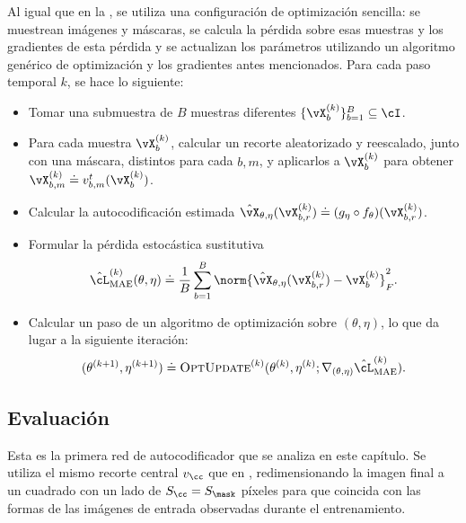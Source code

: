 \documentclass[../../book-main_es.tex]{subfiles}
\begin{document}
Al igual que en la , se utiliza una configuración de optimización sencilla:
se muestrean imágenes y máscaras, se calcula la pérdida sobre
esas muestras y los gradientes de esta pérdida y se actualizan los
parámetros utilizando un algoritmo genérico de optimización y los
gradientes antes mencionados. Para cada paso temporal \(k\), se hace lo siguiente:
\begin{itemize}
\item Tomar una submuestra de \(B\) muestras diferentes \(\{\vX_{b}^{(k)}\}_{b =
    1}^{B} \subseteq \cI\).
\item Para cada muestra \(\vX_{b}^{(k)}\), calcular un recorte aleatorizado y reescalado, 
    junto con una máscara, distintos para cada \(b, m\), y aplicarlos a \(\vX_{b}^{(k)}\) 
    para obtener \(\vX_{b,m}^{(k)} \doteq v_{b,m}^{t}(\vX_{b}^{(k)})\).
\item Calcular la autocodificación estimada \(\hat{\vX}_{\theta,
        \eta}(\vX_{b, r}^{(k)}) \doteq (g_{\eta} \circ
    f_{\theta})(\vX_{b, r}^{(k)})\).
\item Formular la pérdida estocástica sustitutiva
    \begin{equation}
        \hat{\cL}_{\mathrm{MAE}}^{(k)}(\theta, \eta) \doteq
        \frac{1}{B}\sum_{b = 1}^{B}\norm{\hat{\vX}_{\theta,
        \eta}(\vX_{b, r}^{(k)}) - \vX_{b}^{(k)}}_{F}^{2}.
    \end{equation}
\item Calcular un paso de un algoritmo de optimización sobre \((\theta,
    \eta)\), lo que da lugar a la siguiente iteración:
    \begin{equation}
        (\theta^{(k + 1)}, \eta^{(k + 1)}) \doteq
        \textsc{OptUpdate}^{(k)}(\theta^{(k)}, \eta^{(k)};
        \nabla_{(\theta, \eta)}\hat{\cL}_{\mathrm{MAE}}^{(k)}).
    \end{equation}
\end{itemize}

\subsection{Evaluación} \label{sub:image_completion_optimization_1}

Esta es la primera red de autocodificador que se analiza en este capítulo. Se utiliza
el mismo recorte central \(v_{\cc}\) que en
,
redimensionando la imagen final a un cuadrado con un lado de \(S_{\cc} =
S_{\mask}\) píxeles para que coincida con las formas de las imágenes de entrada observadas durante el entrenamiento.
\end{document}
